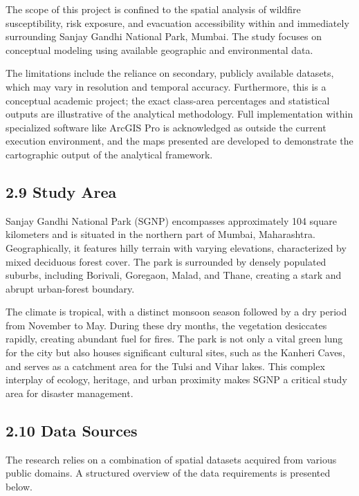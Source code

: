 \documentclass[12pt,a4paper]{article}
\begin{document}
The scope of this project is confined to the spatial analysis of wildfire susceptibility, risk exposure, and evacuation accessibility within and immediately surrounding Sanjay Gandhi National Park, Mumbai. The study focuses on conceptual modeling using available geographic and environmental data.


The limitations include the reliance on secondary, publicly available datasets, which may vary in resolution and temporal accuracy. Furthermore, this is a conceptual academic project; the exact class-area percentages and statistical outputs are illustrative of the analytical methodology. Full implementation within specialized software like ArcGIS Pro is acknowledged as outside the current execution environment, and the maps presented are developed to demonstrate the cartographic output of the analytical framework.



\subsection*{2.9 Study Area}

Sanjay Gandhi National Park (SGNP) encompasses approximately 104 square kilometers and is situated in the northern part of Mumbai, Maharashtra. Geographically, it features hilly terrain with varying elevations, characterized by mixed deciduous forest cover. The park is surrounded by densely populated suburbs, including Borivali, Goregaon, Malad, and Thane, creating a stark and abrupt urban-forest boundary.


The climate is tropical, with a distinct monsoon season followed by a dry period from November to May. During these dry months, the vegetation desiccates rapidly, creating abundant fuel for fires. The park is not only a vital green lung for the city but also houses significant cultural sites, such as the Kanheri Caves, and serves as a catchment area for the Tulsi and Vihar lakes. This complex interplay of ecology, heritage, and urban proximity makes SGNP a critical study area for disaster management.



\subsection*{2.10 Data Sources}

The research relies on a combination of spatial datasets acquired from various public domains. A structured overview of the data requirements is presented below.
\end{document}
